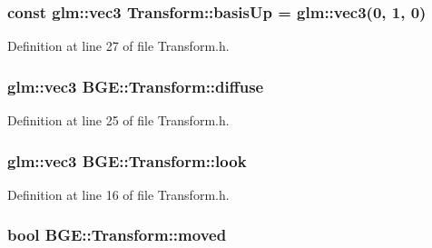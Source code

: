 \hypertarget{class_b_g_e_1_1_transform_a4138712e358f3407c2e581a577bba923}{
\subsubsection[{basis\-Up}]{\setlength{\rightskip}{0pt plus 5cm}const glm\-::vec3 Transform\-::basis\-Up = glm\-::vec3(0, 1, 0)\hspace{0.3cm}{\ttfamily [static]}}}\label{class_b_g_e_1_1_transform_a4138712e358f3407c2e581a577bba923}


Definition at line 27 of file Transform.\-h.

\hypertarget{class_b_g_e_1_1_transform_ae7028b3d27235e33ae62f36256e0d8ff}{
\subsubsection[{diffuse}]{\setlength{\rightskip}{0pt plus 5cm}glm\-::vec3 B\-G\-E\-::\-Transform\-::diffuse}}\label{class_b_g_e_1_1_transform_ae7028b3d27235e33ae62f36256e0d8ff}


Definition at line 25 of file Transform.\-h.

\hypertarget{class_b_g_e_1_1_transform_a26a45bbb5d264d4a6c1dce74c25e4b01}{
\subsubsection[{look}]{\setlength{\rightskip}{0pt plus 5cm}glm\-::vec3 B\-G\-E\-::\-Transform\-::look}}\label{class_b_g_e_1_1_transform_a26a45bbb5d264d4a6c1dce74c25e4b01}


Definition at line 16 of file Transform.\-h.

\hypertarget{class_b_g_e_1_1_transform_a7898a1ec8e3133d07f8961cb117697d9}{
\subsubsection[{moved}]{\setlength{\rightskip}{0pt plus 5cm}bool B\-G\-E\-::\-Transform\-::moved}}\label{class_b_g_e_1_1_transform_a7898a1ec8e3133d07f8961cb117697d9}


